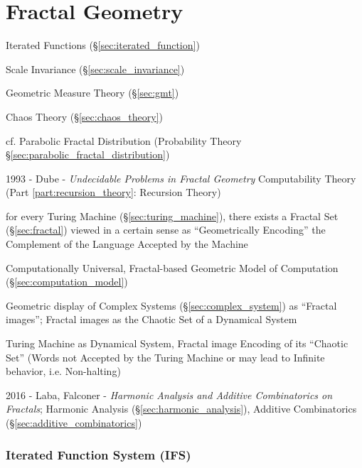 \part{Fractal Geometry}\label{part:fractal_geometry}

Iterated Functions (\S\ref{sec:iterated_function})

Scale Invariance (\S\ref{sec:scale_invariance})

Geometric Measure Theory (\S\ref{sec:gmt})

Chaos Theory (\S\ref{sec:chaos_theory})

cf. Parabolic Fractal Distribution (Probability Theory
\S\ref{sec:parabolic_fractal_distribution})

\asterism

1993 - Dube - \emph{Undecidable Problems in Fractal Geometry} \fist
Computability Theory (Part \ref{part:recursion_theory}: Recursion Theory)

for every Turing Machine (\S\ref{sec:turing_machine}), there exists a Fractal
Set (\S\ref{sec:fractal}) viewed in a certain sense as ``Geometrically
Encoding'' the Complement of the Language Accepted by the Machine

Computationally Universal, Fractal-based Geometric Model of Computation
(\S\ref{sec:computation_model})

Geometric display of Complex Systems (\S\ref{sec:complex_system}) as ``Fractal
images''; Fractal images as the Chaotic Set of a Dynamical System

Turing Machine as Dynamical System, Fractal image Encoding of its ``Chaotic
Set'' (Words not Accepted by the Turing Machine or may lead to Infinite
behavior, i.e. Non-halting)

\asterism

2016 - Laba, Falconer - \emph{Harmonic Analysis and Additive Combinatorics on
  Fractals}; Harmonic Analysis (\S\ref{sec:harmonic_analysis}), Additive
Combinatorics (\S\ref{sec:additive_combinatorics})



\section{Iterated Function System (IFS)}\label{sec:ifs}

